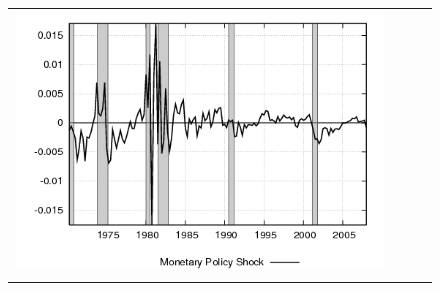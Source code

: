 \begin{figure}
\begin{tabular}{cccc}
\includegraphics[scale=0.22]{results_reinit/mpshock.png} \\ \\ 
 

\end{tabular}
\end{figure}
